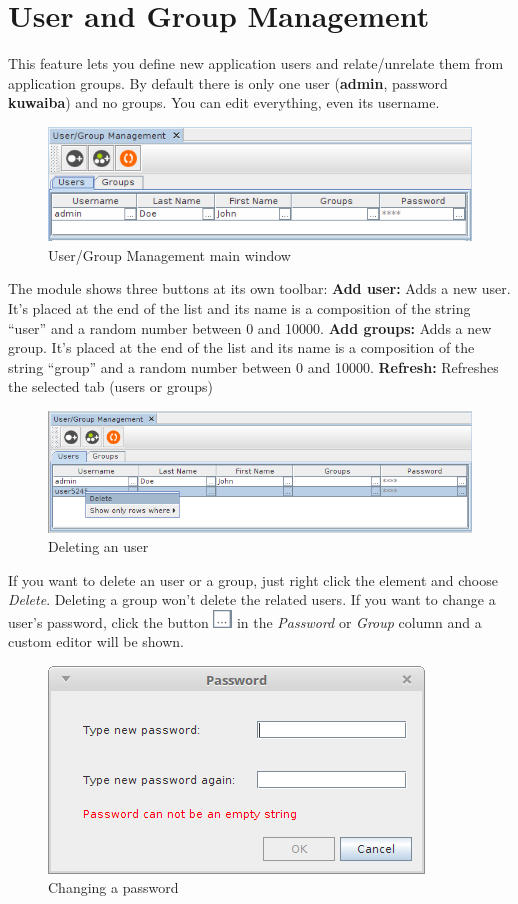 \documentclass[a4paper]{article}
\begin{document}
		\section{User and Group Management} \label{sec:user_and_group_management}
		This feature lets you define new application users and relate/unrelate them from application groups. By default there is only one user (\textbf{admin}, password \textbf{kuwaiba}) and no groups.  You can edit everything, even its username.
		\begin{figure}[h!]
			\centering
			\includegraphics[width=0.7\linewidth]{img/users_and_groups_default_user.png}
			\caption{User/Group Management main window}
			\label{fig:users_and_groups_default_user}
		\end{figure}
		The module shows three buttons at its own toolbar:
		\textbf{Add user:} Adds a new user. It's placed at the end of the list and its name is a composition of the string “user” and a random number between 0 and 10000.
		\textbf{Add groups:} Adds a new group. It's placed at the end of the list and its name is a composition of the string “group” and a random number between 0 and 10000.
		\textbf{Refresh:} Refreshes the selected tab (users or groups)	
		\begin{figure}[h!]
			\centering
			\includegraphics[width=0.6\linewidth]{img/users_and_groups_delete.png}
			\caption{Deleting an user}
			\label{fig:users_and_groups_delete}
		\end{figure}
		
		If you want to delete an user or a group, just right click the element and choose \textit{Delete}. Deleting a group won't delete the related users. If you want to change a user's password, click the button  \includegraphics[width=0.5cm]{img/icon_edit_user.png} in the \textit{Password} or \textit{Group} column and a custom editor will be shown.
		\begin{figure}[h!]
			\centering
			\includegraphics[width=0.3\linewidth]{img/users_and_groups_change_password.png}
			\caption{Changing a password}
			\label{fig:users_and_groups_change_password}
		\end{figure}
	
\end{document}
